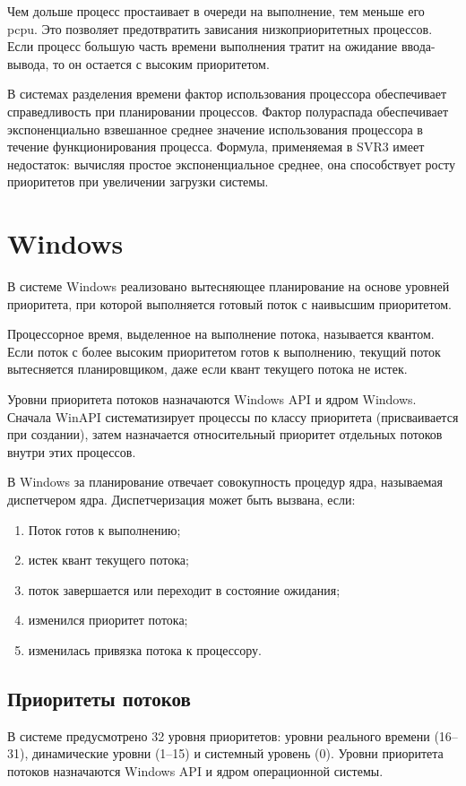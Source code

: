 \documentclass[12pt]{report}
\begin{document}
Чем дольше процесс простаивает в очереди на выполнение, тем меньше его p\textunderscore cpu. Это позволяет предотвратить зависания низкоприоритетных процессов. Если процесс большую часть времени выполнения тратит на ожидание ввода-вывода, то он остается с высоким приоритетом.

В системах разделения времени фактор использования процессора обеспечивает справедливость при планировании процессов. Фактор полураспада обеспечивает экспоненциально взвешанное среднее значение использования процессора в течение функционирования процесса. Формула, применяемая в SVR3 имеет недостаток: вычисляя простое экспоненциальное среднее, она способствует росту приоритетов при увеличении загрузки системы.
\section{Windows}
В системе Windows реализовано вытесняющее планирование на основе уровней приоритета, при которой выполняется готовый поток с наивысшим приоритетом.

Процессорное время, выделенное на выполнение потока, называется квантом. Если поток с более высоким приоритетом готов к выполнению, текущий поток вытесняется планировщиком, даже если квант текущего потока не истек.

Уровни приоритета потоков назначаются Windows API и ядром Windows. Сначала WinAPI систематизирует процессы по классу приоритета (присваивается при создании), затем назначается относительный приоритет отдельных потоков внутри этих процессов.

\newpage
В Windows за планирование отвечает совокупность процедур ядра, называемая диспетчером ядра. Диспетчеризация может быть вызвана, если:
\begin{enumerate}
	\item Поток готов к выполнению;
	\item истек квант текущего потока;
	\item поток завершается или переходит в состояние ожидания;
	\item изменился приоритет потока;
	\item изменилась привязка потока к процессору.
\end{enumerate}
\subsection{Приоритеты потоков}
В системе предусмотрено 32 уровня приоритетов: уровни реального времени (16–31), динамические уровни (1–15) и системный уровень (0).
Уровни приоритета потоков назначаются Windows API и ядром операционной системы.
\end{document}
